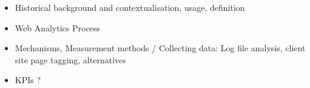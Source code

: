 \begin{itemize}
\item Historical background and contextualisation, usage, definition
\item Web Analytics Process
\item Mechanisms, Measurement methods / Collecting data: Log file analysis, client site page tagging, alternatives
\item KPIs ?
\end{itemize}






























